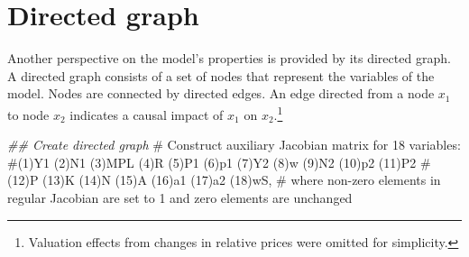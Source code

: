 \documentclass[
  letterpaper,
  DIV=11,
  numbers=noendperiod]{scrreprt}
\newenvironment{Shaded}{\begin{snugshade}}{\end{snugshade}}
\newcommand{\CommentTok}[1]{\textcolor[rgb]{0.37,0.37,0.37}{#1}}
\newcommand{\DocumentationTok}[1]{\textcolor[rgb]{0.37,0.37,0.37}{\textit{#1}}}
\begin{document}
\section{Directed graph}\label{directed-graph-11}

Another perspective on the model's properties is provided by its
directed graph. A directed graph consists of a set of nodes that
represent the variables of the model. Nodes are connected by directed
edges. An edge directed from a node \(x_1\) to node \(x_2\) indicates a
causal impact of \(x_1\) on \(x_2\).\footnote{Valuation effects from
  changes in relative prices were omitted for simplicity.}

\begin{Shaded}
\begin{Highlighting}[]
\DocumentationTok{\#\# Create directed graph}
\CommentTok{\# Construct auxiliary Jacobian matrix for 18 variables: }
\CommentTok{\#(1)Y1 (2)N1 (3)MPL (4)R (5)P1 (6)p1 (7)Y2 (8)w (9)N2 (10)p2 (11)P2}
\CommentTok{\#(12)P (13)K (14)N (15)A (16)a1 (17)a2 (18)wS,}
\CommentTok{\# where non{-}zero elements in regular Jacobian are set to 1 and zero elements are unchanged}


\end{Highlighting}
\end{Shaded}
\end{document}
